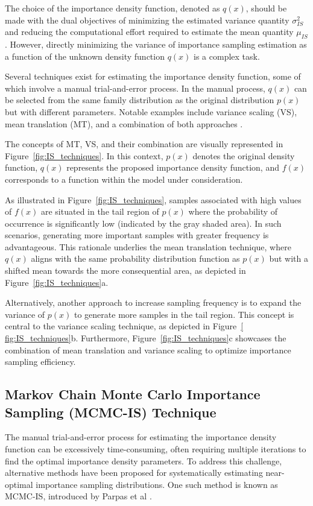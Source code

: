         The choice of the importance density function, denoted as $q(x)$, should be made with the dual objectives of minimizing the estimated variance quantity $\sigma_{IS}^2$ and reducing the computational effort required to estimate the mean quantity $\mu_{IS}$. However, directly minimizing the variance of importance sampling estimation as a function of the unknown density function $q(x)$ is a complex task.
        
        Several techniques exist for estimating the importance density function, some of which involve a manual trial-and-error process. In the manual process, $q(x)$ can be selected from the same family distribution as the original distribution $p(x)$ but with different parameters. Notable examples include variance scaling (VS), mean translation (MT), and a combination of both approaches \cite{lu_improved_1988}.
        
        The concepts of MT, VS, and their combination are visually represented in Figure~\ref{fig:IS_techniques}. In this context, $p(x)$ denotes the original density function, $q(x)$ represents the proposed importance density function, and $f(x)$ corresponds to a function within the model under consideration.
        
        
        
        As illustrated in Figure~\ref{fig:IS_techniques}, samples associated with high values of $f(x)$ are situated in the tail region of $p(x)$ where the probability of occurrence is significantly low (indicated by the gray shaded area). In such scenarios, generating more important samples with greater frequency is advantageous. This rationale underlies the mean translation technique, where $q(x)$ aligns with the same probability distribution function as $p(x)$ but with a shifted mean towards the more consequential area, as depicted in Figure~\ref{fig:IS_techniques}a.
        
        Alternatively, another approach to increase sampling frequency is to expand the variance of $p(x)$ to generate more samples in the tail region. This concept is central to the variance scaling technique, as depicted in Figure~\ref{ fig:IS_techniques}b. Furthermore, Figure~\ref{fig:IS_techniques}c showcases the combination of mean translation and variance scaling to optimize importance sampling efficiency.

    \subsection{Markov Chain Monte Carlo Importance Sampling (MCMC-IS) Technique} 
        The manual trial-and-error process for estimating the importance density function can be excessively time-consuming, often requiring multiple iterations to find the optimal importance density parameters. To address this challenge, alternative methods have been proposed for systematically estimating near-optimal importance sampling distributions. One such method is known as MCMC-IS, introduced by Parpas et al \cite{parpas_importance_2015}.

